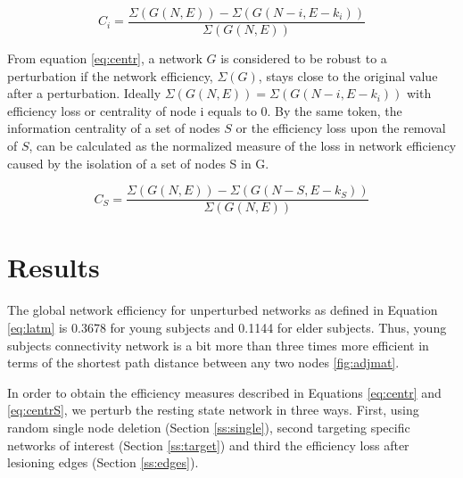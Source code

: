 \documentclass[12pt,a4paper]{article}
\begin{document}
\begin{equation}
C_i=\frac {\Sigma(G(N,E)) - \Sigma(G(N-i,E-k_i))} {\Sigma(G(N,E))} 
\label{eq:centr}
\end{equation}

From equation \ref{eq:centr}, a network $G$ is considered to be robust to
a perturbation if the network efficiency, $\Sigma(G)$, 
stays close to the original value after a perturbation. Ideally $\Sigma(G(N,E)) = \Sigma(G(N -i,E-k_i))$
with efficiency loss or centrality of node i equals to 0.
By the same token, the information centrality of a set of nodes $S$ or the efficiency loss upon the removal of $S$, can be calculated as the normalized measure of the loss in network efficiency caused by the isolation of a set of nodes S in G.

\begin{equation}
C_S=\frac {\Sigma(G(N,E)) - \Sigma(G(N-S,E-k_S)) } {\Sigma(G(N,E))} 
\label{eq:centrS}
\end{equation}

\section{Results}
\label{results}

 The global network efficiency for unperturbed networks as defined in Equation \ref{eq:latm} is
 0.3678 for young subjects and 0.1144 for elder subjects. Thus, young subjects
 connectivity network is a bit more than three times more efficient in terms of the shortest
 path distance between any two nodes \ref{fig:adjmat}.

In order to obtain the efficiency measures described in Equations \ref{eq:centr} and \ref{eq:centrS}, we perturb the resting state network in three ways. First, using random single node deletion (Section \ref{ss:single}),  second targeting specific networks of interest (Section \ref{ss:target}) and third the efficiency loss after lesioning edges (Section \ref{ss:edges}). 
\end{document}
